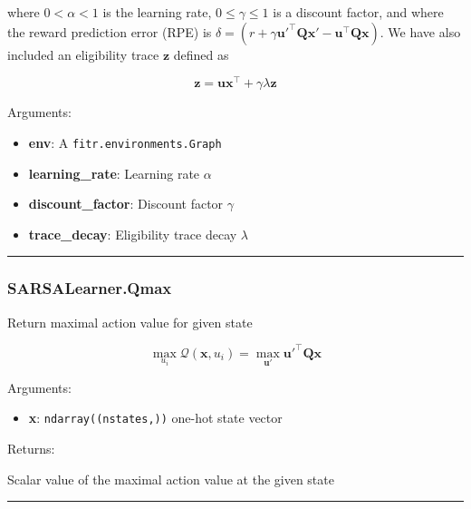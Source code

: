 where \(0 < \alpha < 1\) is the learning rate, \(0 \leq \gamma \leq 1\)
is a discount factor, and where the reward prediction error (RPE) is
\(\delta = (r + \gamma \mathbf u'^\top \mathbf Q \mathbf x' - \mathbf u^\top \mathbf Q \mathbf x)\).
We have also included an eligibility trace \(\mathbf z\) defined as

\[
\mathbf z = \mathbf u \mathbf x^\top +  \gamma \lambda \mathbf z
\]

Arguments:

\begin{itemize}
\tightlist
\item
  \textbf{env}: A \texttt{fitr.environments.Graph}
\item
  \textbf{learning\_rate}: Learning rate \(\alpha\)
\item
  \textbf{discount\_factor}: Discount factor \(\gamma\)
\item
  \textbf{trace\_decay}: Eligibility trace decay \(\lambda\)
\end{itemize}

\begin{center}\rule{0.5\linewidth}{\linethickness}\end{center}

\subsubsection{SARSALearner.Qmax}\label{sarsalearner.qmax}

\begin{Shaded}
\begin{Highlighting}[]
\end{Highlighting}
\end{Shaded}

Return maximal action value for given state

\[
\max_{u_i}\mathcal Q(\mathbf x, u_i) = \max_{\mathbf u'} \mathbf u'^\top \mathbf Q \mathbf x
\]

Arguments:

\begin{itemize}
\tightlist
\item
  \textbf{x}: \texttt{ndarray((nstates,))} one-hot state vector
\end{itemize}

Returns:

Scalar value of the maximal action value at the given state

\begin{center}\rule{0.5\linewidth}{\linethickness}\end{center}

